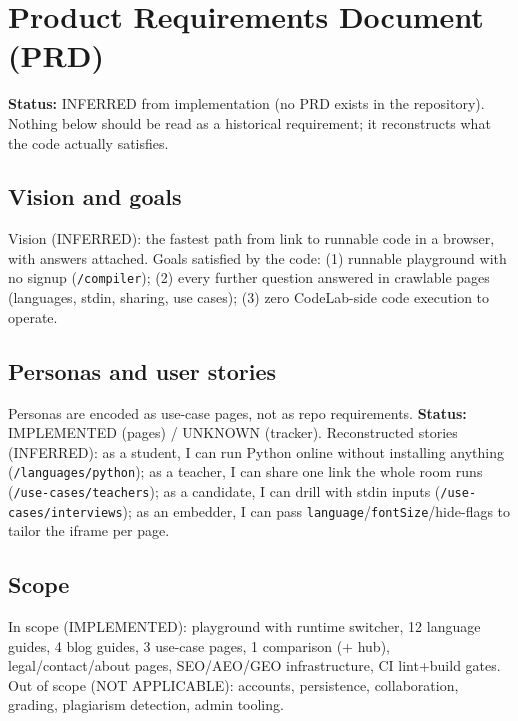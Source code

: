 \section{Product Requirements Document (PRD)}
\label{sec:prd}

\textbf{Status:} INFERRED from implementation (no PRD exists in the repository). Nothing below should be read as a historical requirement; it reconstructs what the code actually satisfies.

\subsection{Vision and goals}
Vision (INFERRED): the fastest path from link to runnable code in a browser, with answers attached. Goals satisfied by the code: (1) runnable playground with no signup (\texttt{/compiler}); (2) every further question answered in crawlable pages (languages, stdin, sharing, use cases); (3) zero CodeLab-side code execution to operate.

\subsection{Personas and user stories}
Personas are encoded as use-case pages, not as repo requirements. \textbf{Status:} IMPLEMENTED (pages) / UNKNOWN (tracker). Reconstructed stories (INFERRED): as a student, I can run Python online without installing anything (\texttt{/languages/python}); as a teacher, I can share one link the whole room runs (\texttt{/use-cases/teachers}); as a candidate, I can drill with stdin inputs (\texttt{/use-cases/interviews}); as an embedder, I can pass \texttt{language}/\texttt{fontSize}/hide-flags to tailor the iframe per page.

\subsection{Scope}
In scope (IMPLEMENTED): playground with runtime switcher, 12 language guides, 4 blog guides, 3 use-case pages, 1 comparison (+ hub), legal/contact/about pages, SEO/AEO/GEO infrastructure, CI lint+build gates. Out of scope (NOT APPLICABLE): accounts, persistence, collaboration, grading, plagiarism detection, admin tooling.

